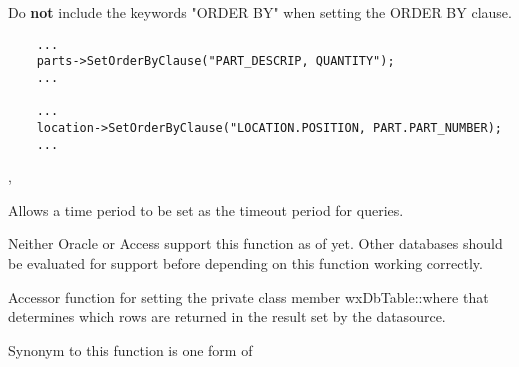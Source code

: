 
Do {\bf not} include the keywords "ORDER BY" when setting the ORDER BY clause.


\begin{verbatim}
    ...
    parts->SetOrderByClause("PART_DESCRIP, QUANTITY");
    ...

    ...
    location->SetOrderByClause("LOCATION.POSITION, PART.PART_NUMBER);
    ...
\end{verbatim}


, 


\label{wxdbtablesetquerytimeout}


Allows a time period to be set as the timeout period for queries.




Neither Oracle or Access support this function as of yet.  Other databases 
should be evaluated for support before depending on this function working 
correctly.


\label{wxdbtablesetwhereclause}


Accessor function for setting the private class member wxDbTable::where 
that determines which rows are returned in the result set by the datasource.

Synonym to this function is one form of 




